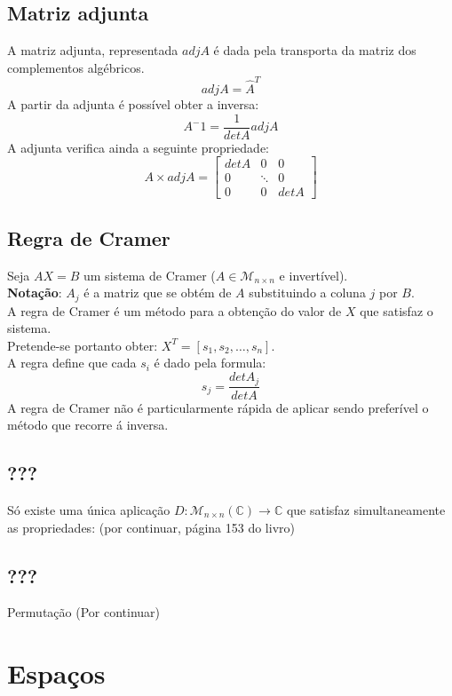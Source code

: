 \documentclass[]{report}
\begin{document}
\section{Matriz adjunta}
A matriz adjunta, representada $adj A$ é dada pela transporta da matriz dos complementos algébricos.
$$adj A = \hat A^T$$
A partir da adjunta é possível obter a inversa:
$$A^-1 = \frac{1}{det A} adj A$$
A adjunta verifica ainda a seguinte propriedade:
$$
A \times adj A =
\begin{bmatrix}
det A & 0 & 0\\
0 & \ddots & 0\\
0 & 0 & det A
\end{bmatrix}
$$
\section{Regra de Cramer}
Seja $AX=B$ um sistema de Cramer ($A \in \mathcal{M}_{n \times n}$ e invertível).\\[0.2cm]
\textbf{Notação}: $A_j$ é a matriz que se obtém de $A$  substituindo a coluna $j$ por $B$.\\[0.2cm]
A regra de Cramer é um método para a obtenção do valor de $X$ que satisfaz o sistema.\\
Pretende-se portanto obter: $X^T=[s_1, s_2, \dots, s_n]$.\\
A regra define que cada $s_i$ é dado pela formula:
$$s_j = \frac{det A_j}{det A}$$
A regra de Cramer não é particularmente rápida de aplicar sendo preferível o método que recorre á inversa.
\section{???}
Só existe uma única aplicação $D: \mathcal{M}_{n \times n}(\mathbb{C}) \rightarrow \mathbb{C}$ que satisfaz simultaneamente as propriedades:
(por continuar, página 153 do livro)
\section{???}
Permutação (Por continuar)
\chapter{Espaços}
\end{document}
